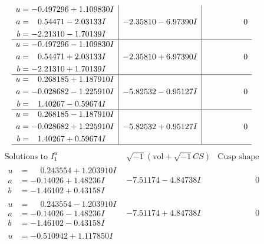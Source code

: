 \documentclass[1p]{elsarticle_modified}
\theoremstyle{definition}
\newcommand{\I}{\sqrt{-1}}
\begin{document}
$$\begin{array}{c|c|c}
\begin{aligned}
u &= -0.497296 + 1.109830 I \\
a &= \phantom{-}0.54471 - 2.03133 I \\
b &= -2.21310 - 1.70139 I\end{aligned}
 & -2.35810 - 6.97390 I & \phantom{-0.000000 } 0 \\ \hline\begin{aligned}
u &= -0.497296 - 1.109830 I \\
a &= \phantom{-}0.54471 + 2.03133 I \\
b &= -2.21310 + 1.70139 I\end{aligned}
 & -2.35810 + 6.97390 I & \phantom{-0.000000 } 0 \\ \hline\begin{aligned}
u &= \phantom{-}0.268185 + 1.187910 I \\
a &= -0.028682 - 1.225910 I \\
b &= \phantom{-}1.40267 - 0.59674 I\end{aligned}
 & -5.82532 - 0.95127 I & \phantom{-0.000000 } 0 \\ \hline\begin{aligned}
u &= \phantom{-}0.268185 - 1.187910 I \\
a &= -0.028682 + 1.225910 I \\
b &= \phantom{-}1.40267 + 0.59674 I\end{aligned}
 & -5.82532 + 0.95127 I & \phantom{-0.000000 } 0\\
 \hline 
 \end{array}$$\newpage$$\begin{array}{c|c|c}  
\text{Solutions to }I^u_{1}& \I (\text{vol} + \sqrt{-1}CS) & \text{Cusp shape}\\
 \hline 
\begin{aligned}
u &= \phantom{-}0.243554 + 1.203910 I \\
a &= -0.14026 + 1.48236 I \\
b &= -1.46102 + 0.43158 I\end{aligned}
 & -7.51174 - 4.84738 I & \phantom{-0.000000 } 0 \\ \hline\begin{aligned}
u &= \phantom{-}0.243554 - 1.203910 I \\
a &= -0.14026 - 1.48236 I \\
b &= -1.46102 - 0.43158 I\end{aligned}
 & -7.51174 + 4.84738 I & \phantom{-0.000000 } 0 \\ \hline\begin{aligned}
u &= -0.510942 + 1.117850 I \\

\end{aligned}
\end{array}$$
\end{document}
